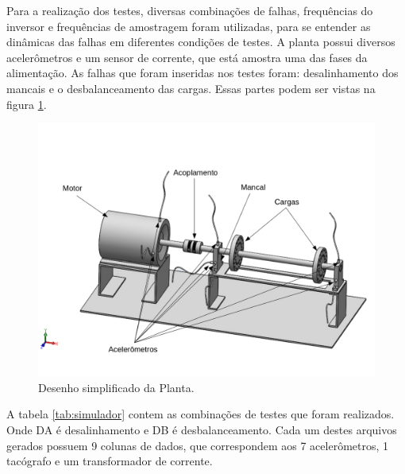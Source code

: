Para a realização dos testes, diversas combinações de falhas, frequências do inversor e frequências de amostragem foram
utilizadas, para se entender as dinâmicas das falhas em diferentes condições de testes. A planta possui diversos acelerômetros e um sensor
de corrente, que está amostra uma das fases da alimentação. As falhas que foram inseridas nos testes foram: desalinhamento dos
mancais e o desbalanceamento das cargas. Essas partes podem ser vistas na figura \ref{fig:lateral_desenho}.

\begin{figure}[H]
    \caption{Desenho simplificado da Planta.}
    \begin{center}
        \includegraphics[scale=.5]{metodologia/img/lateral_desenho.png}
    \end{center}
    \label{fig:lateral_desenho}
\end{figure}

A tabela \ref{tab:simulador} contem as combinações de testes que foram realizados. Onde DA é desalinhamento e DB é desbalanceamento.
Cada um destes arquivos gerados possuem 9 colunas de dados, que correspondem aos 7 acelerômetros, 1 tacógrafo e um transformador de
corrente.

